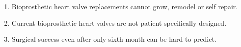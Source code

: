 \begin{enumerate}
\item Bioprosthetic heart valve replacements cannot grow, remodel or self repair.
\item Current bioprosthetic heart valves are not patient specifically designed. 
\item Surgical success even after only sixth month can be hard to predict. 
\end{enumerate}